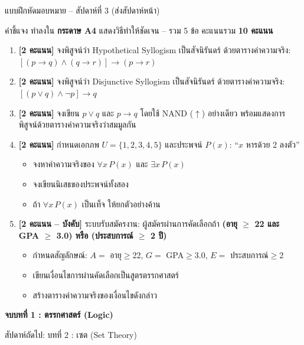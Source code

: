 \begin{frame}{แบบฝึกหัดมอบหมาย -- สัปดาห์ที่ 3 (ส่งสัปดาห์หน้า)}
  \begin{block}{คำชี้แจง}
    ทำลงใน \textbf{กระดาษ A4} แสดงวิธีทำให้ชัดเจน -- รวม 5 ข้อ คะแนนรวม \textbf{10 คะแนน}
  \end{block}
  \vspace{0.3em}
  \begin{enumerate}\small
    \item \textbf{[2 คะแนน]} จงพิสูจน์ว่า Hypothetical Syllogism เป็นสัจนิรันดร์
          ด้วยตารางค่าความจริง: $[(p\rightarrow q)\land(q\rightarrow r)]\rightarrow(p\rightarrow r)$
    \item \textbf{[2 คะแนน]} จงพิสูจน์ว่า Disjunctive Syllogism เป็นสัจนิรันดร์
          ด้วยตารางค่าความจริง: $[(p\lor q)\land \neg p]\rightarrow q$
    \item \textbf{[2 คะแนน]} จงเขียน $p \lor q$ และ $p \rightarrow q$ โดยใช้ NAND ($\uparrow$) อย่างเดียว
          พร้อมแสดงการพิสูจน์ด้วยตารางค่าความจริงว่าสมมูลกัน
    \item \textbf{[2 คะแนน]} กำหนดเอกภพ $U=\{1,2,3,4,5\}$ และประพจน์ $P(x)$: ``$x$ หารด้วย 2 ลงตัว''
          \begin{itemize}\small
            \item จงหาค่าความจริงของ $\forall x\,P(x)$ และ $\exists x\,P(x)$
            \item จงเขียนนิเสธของประพจน์ทั้งสอง
            \item ถ้า $\forall x\,P(x)$ เป็นเท็จ ให้ยกตัวอย่างค้าน
          \end{itemize}
    \item \textbf{[2 คะแนน -- บังคับ]} ระบบรับสมัครงาน: ผู้สมัครผ่านการคัดเลือกถ้า
          \textbf{(อายุ $\geq$ 22 และ GPA $\geq$ 3.0) หรือ (ประสบการณ์ $\geq$ 2 ปี)}
          \begin{itemize}\small
            \item กำหนดสัญลักษณ์: $A=$ อายุ$\geq$22, $G=$ GPA$\geq$3.0, $E=$ ประสบการณ์$\geq$2
            \item เขียนเงื่อนไขการผ่านคัดเลือกเป็นสูตรตรรกศาสตร์
            \item สร้างตารางค่าความจริงของเงื่อนไขดังกล่าว
          \end{itemize}
  \end{enumerate}
\end{frame}

\begin{frame}[plain]
  \vfill
  \centering
  {\Large\color{navy}\textbf{จบบทที่ 1 : ตรรกศาสตร์ (Logic)}}\par
  \vspace{0.8em}
  {\color{gray} สัปดาห์ถัดไป: บทที่ 2 : เซต (Set Theory)}
  \vfill
\end{frame}
